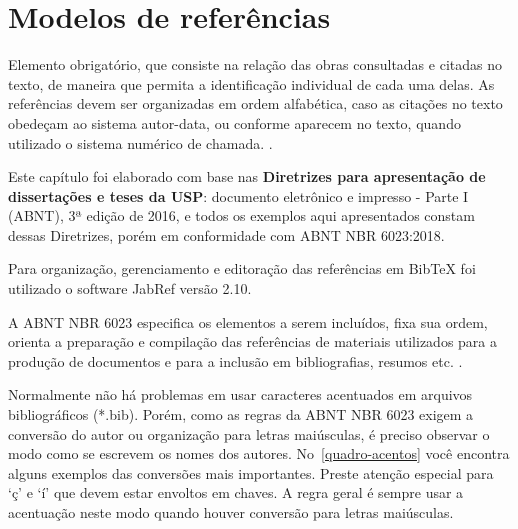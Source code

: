 

\chapter{Modelos de refer\^encias}
\label{Refer\^encias}
Elemento obrigatório, que consiste na relação das obras consultadas e citadas no texto, de maneira que permita a identificação individual de cada uma delas. As refer\^encias devem ser organizadas em ordem alfab\'etica, caso as citações no texto obedeçam ao sistema autor-data, ou conforme aparecem no texto, quando utilizado o sistema num\'erico de chamada. \cite{sibi2016}.

Este capítulo foi elaborado com base nas \textbf{Diretrizes para apresentação de dissertações e teses da USP}: documento eletrônico e impresso - Parte I (ABNT), 3ª edição de 2016, e todos os exemplos aqui apresentados constam dessas Diretrizes, por\'em em conformidade com ABNT NBR 6023:2018. 

Para organização, gerenciamento e editoração das refer\^encias em BibTeX foi utilizado o software JabRef versão 2.10.

A ABNT NBR 6023 especifica os elementos a serem incluídos, fixa sua ordem, orienta a preparação e compilação das refer\^encias de materiais utilizados para a produção de documentos e para a inclusão em bibliografias, resumos etc. \cite{nbr6023a}.

Normalmente não h\'a problemas em usar caracteres acentuados em arquivos bibliogr\'aficos {(*.bib)}. Por\'em, como as regras da ABNT NBR 6023 exigem a conversão do autor ou organização para letras maiúsculas, \'e preciso observar o modo como se escrevem os nomes dos autores. No~\autoref{quadro-acentos} voc\^e encontra alguns
exemplos das conversões mais importantes. Preste atenção especial para `ç' e `í'
que devem estar envoltos em chaves. A regra geral \'e sempre usar a acentuação neste modo quando houver conversão para letras maiúsculas. \cite{abnetxcite} \\

